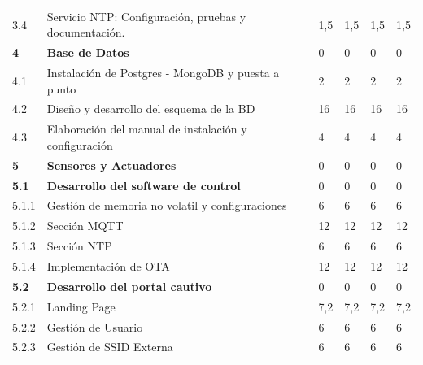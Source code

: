 \documentclass[11pt]{charter}
\begin{document}
\begin{landscape}
\begin{tabularx}{\linewidth}{@{}|p{2cm}|p{11cm}|p{2.4cm}|p{2.4cm}|p{2.4cm}|p{2.4cm}|@{}}
3.4            & Servicio NTP: Configuración,   pruebas y documentación.                                       & 1,5  & 1,5  & 1,5  & 1,5  \\
\textbf{4}     & \textbf{Base de Datos}                                                                        & 0    & 0    & 0    & 0    \\
4.1            & Instalación de Postgres -   MongoDB y puesta a punto                                          & 2    & 2    & 2    & 2    \\
4.2            & Diseño y desarrollo del esquema   de la BD                                                    & 16   & 16   & 16   & 16   \\
4.3            & Elaboración del manual de   instalación y configuración                                       & 4    & 4    & 4    & 4    \\
\textbf{5}     & \textbf{Sensores y Actuadores}                                                                & 0    & 0    & 0    & 0    \\
\textbf{5.1}   & \textbf{Desarrollo del software de   control}                                                 & 0    & 0    & 0    & 0    \\
5.1.1          & Gestión de memoria no volatil y   configuraciones                                             & 6    & 6    & 6    & 6    \\
5.1.2          & Sección MQTT                                                                                  & 12   & 12   & 12   & 12   \\
5.1.3          & Sección NTP                                                                                   & 6    & 6    & 6    & 6    \\
5.1.4          & Implementación de OTA                                                                         & 12   & 12   & 12   & 12   \\
\textbf{5.2}   & \textbf{Desarrollo del portal cautivo}                                                        & 0    & 0    & 0    & 0    \\
5.2.1          & Landing Page                                                                                  & 7,2  & 7,2  & 7,2  & 7,2  \\
5.2.2          & Gestión de Usuario                                                                            & 6    & 6    & 6    & 6    \\
5.2.3          & Gestión de SSID Externa                                                                       & 6    & 6    & 6    & 6    \\

\end{tabularx}
\end{landscape}
\end{document}
